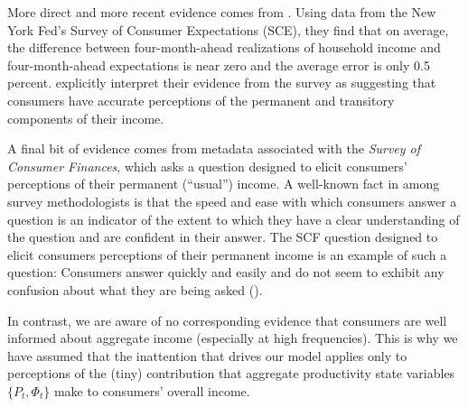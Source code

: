\documentclass[titlepage]{./econtex}
\begin{document}
More direct and more recent evidence comes from \cite{kmpIncomeExpectations}.  Using data from the New York Fed's Survey of Consumer Expectations (SCE), they find that on average, the difference between four-month-ahead realizations of household income and four-month-ahead expectations is near zero and the average error is only 0.5 percent. \cite{kmpIncomeExpectations} explicitly interpret their evidence from the survey as suggesting that consumers have accurate perceptions of the permanent and transitory components of their income.

A final bit of evidence comes from metadata associated with the \textit{Survey of Consumer Finances}, which asks a question designed to elicit consumers' perceptions of their permanent (``usual'') income.  A well-known fact in among survey methodologists is that the speed and ease with which consumers answer a question is an indicator of the extent to which they have a clear understanding of the question and are confident in their answer.  The SCF question designed to elicit consumers perceptions of their permanent income is an example of such a question: Consumers answer quickly and easily and do not seem to exhibit any confusion about what they are being asked (\cite{kennickellPermanent}).

In contrast, we are aware of no corresponding evidence that consumers are well informed about aggregate income (especially at high frequencies). %
 This is why we have assumed that the inattention that drives our model applies only to perceptions of the (tiny) contribution that aggregate productivity state variables $\{P_t,\Phi_t\}$ make to consumers' overall income.
\end{document}
